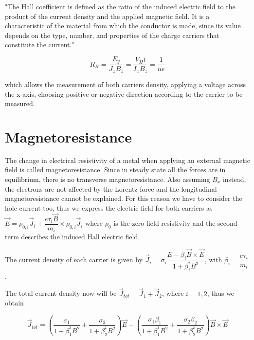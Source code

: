 \documentclass[openany,11pt,a4paper]{report}
\begin{document}
"The Hall coefficient is defined as the ratio of the induced electric field to the product of the current density and the applied magnetic field. It is a characteristic of the material from which the conductor is made, since its value depends on the type, number, and properties of the charge carriers that constitute the current." \cite{hall}

\begin{equation}
R_{H}= \dfrac{E_{y}}{J_{x}B_{z}}= \dfrac{V_{H}t}{I_{x}B_{z}}=\dfrac{1}{ne}
\end{equation}

which allows the measurement of both carriers density, applying a voltage across the x-axis, choosing positive or negative direction according to the carrier to be measured.



\section{Magnetoresistance}
The change in electrical resistivity of a metal when applying an external magnetic field is called magnetoresistance. Since in steady state all the forces are in
equilibrium, there is no transverse magnetoresistance. \cite{appendix}
Also assuming $B_{x}$ instead, the electrons are not affected by the Lorentz force and the longitudinal magnetoresistance cannot be explained. For this reason we have to consider the hole current too, thus we express the electric field for both carriers as $\vec{E} = \rho_{0,i} \vec{J}_{i} + \dfrac{e \tau _{i} \vec{B}}{m_{i}} \times \rho_{0,i} \vec{J}_{i}$ where $\rho_{0}$ is the zero field resistivity and the second term describes the induced Hall electric field.\

The current density of each carrier is given by $\vec{J}_{i}=\sigma _{i} \dfrac{E-\beta _{i}\vec{B} \times \vec{E} }{1+ \beta _{i}^{^{2}} B^{2}}$, with $\beta _{i}= \dfrac{e \tau _{i}}{m_{i}}$.\

The total current density now will be $\vec{J}_{tot}= \vec{J}_{1} + \vec{J}_{2}$, where $i=1,2$, thus we obtain 
 
\begin{equation}
\vec{J}_{tot}= \left( \dfrac{\sigma _{1}}{1+ \beta _{1}^{^{2}} B^{2}}    +  \dfrac{\sigma _{2}}{1+ \beta _{2}^{^{2}} B^{2}}   \right) \vec{E} -  \left( \dfrac{\sigma _{1} \beta _{1}}{1+ \beta _{1}^{^{2}} B^{2}}    +  \dfrac{\sigma _{2} \beta _{2}}{1+ \beta _{2}^{^{2}} B^{2}}   \right) \vec{B} \times \vec{E}
\end{equation}
\end{document}
